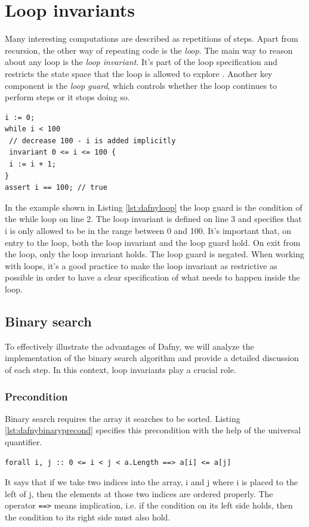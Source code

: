 \documentclass[a4paper]{article}
\begin{document}
\section{Loop invariants}
Many interesting computations are described as repetitions of steps. Apart from recursion,
the other way of repeating code is the \textit{loop}. The main way to reason about any loop is the
\textit{loop invariant}. It's part of the loop specification and restricts the state space that the loop is
allowed to explore \cite{leino2023program}. Another key component is the \textit{loop guard}, which controls
whether the loop continues to perform steps or it stops doing so.
\begin{lstlisting}[style=dafnystyle, caption={Simple while loop.}, label={lst:dafnyloop}]
i := 0;
while i < 100
 // decrease 100 - i is added implicitly
 invariant 0 <= i <= 100 {
 i := i + 1;
}
assert i == 100; // true
\end{lstlisting}
In the example shown in Listing \ref{lst:dafnyloop} the loop guard is the condition of the while loop on line 2. The
loop invariant is defined on line 3 and specifies that i is only allowed to be in the range between 0 and 100. It's
important that, on entry to the loop, both the loop invariant and the loop guard hold. On exit from the loop, only
the loop invariant holds. The loop guard is negated. When working with loops, it's a good practice to make the loop
invariant as restrictive as possible in order to have a clear specification of what needs to happen inside the loop.
\subsection{Binary search}
To effectively illustrate the advantages of Dafny, we will analyze the implementation of the binary search
algorithm and provide a detailed discussion of each step. In this context,
loop invariants play a crucial role.
\subsubsection{Precondition}
Binary search requires the array it searches to be sorted. Listing \ref{lst:dafnybinaryprecond}
specifies this precondition with the help of the universal quantifier.
\begin{lstlisting}[style=dafnystyle, caption={All elements of array \texttt{a} are sorted.}, label={lst:dafnybinaryprecond}]
forall i, j :: 0 <= i < j < a.Length ==> a[i] <= a[j]
\end{lstlisting}
It says that if we take two indices into the array, i and j where i is placed to the left of j,
then the elements at those two indices are ordered properly. The operator \texttt{==>} means implication, i.e.
if the condition on its left side holds, then the condition to its right side must also hold.
\end{document}
